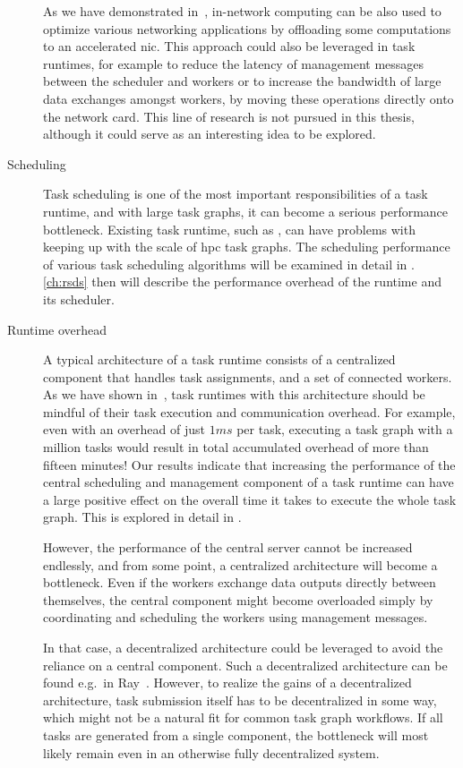 \begin{description}
		As we have demonstrated in~\cite{pspin, spin2}, in-network computing can be also used to
		optimize various networking applications by offloading some computations to an accelerated
		\gls{nic}. This approach could also be leveraged in task runtimes, for example to
		reduce the latency of management messages between the scheduler and workers or to increase the
		bandwidth of large data exchanges amongst workers, by moving these operations directly onto the
		network card. This line of research is not pursued in this thesis, although it could serve as an
		interesting idea to be explored.
	\item[Scheduling] Task scheduling is one of the most important responsibilities of a task runtime, and with large
		task graphs, it can become a serious performance bottleneck. Existing task runtime, such as
		\dask{}, can have problems with keeping up with the scale of
		\gls{hpc} task graphs. The scheduling performance of various task scheduling
		algorithms will be examined in detail in . \autoref{ch:rsds}
		then will describe the performance overhead of the \dask{} runtime and its
		scheduler.
	\item[Runtime overhead] A typical architecture of a task runtime consists of a centralized component that handles task
		assignments, and a set of connected workers. As we have shown in~\cite{rsds}, task
		runtimes with this architecture should be mindful of their task execution and communication
		overhead. For example, even with an overhead of just $1ms$ per task, executing
		a task graph with a million tasks would result in total accumulated overhead of more than fifteen
		minutes! Our results indicate that increasing the performance of the central scheduling and
		management component of a task runtime can have a large positive effect on the overall time it
		takes to execute the whole task graph. This is explored in detail in .

		However, the performance of the central server cannot be increased endlessly, and from some point,
		a centralized architecture will become a bottleneck. Even if the workers exchange data outputs
		directly between themselves, the central component might become overloaded simply by coordinating
		and scheduling the workers using management messages.

		In that case, a decentralized architecture could be leveraged to avoid the reliance on a central
		component. Such a decentralized architecture can be found e.g.\ in Ray~\cite{ray}.
		However, to realize the gains of a decentralized architecture, task submission itself has to be
		decentralized in some way, which might not be a natural fit for common task graph workflows. If all
		tasks are generated from a single component, the bottleneck will most likely remain even in an
		otherwise fully decentralized system.
\end{description}

